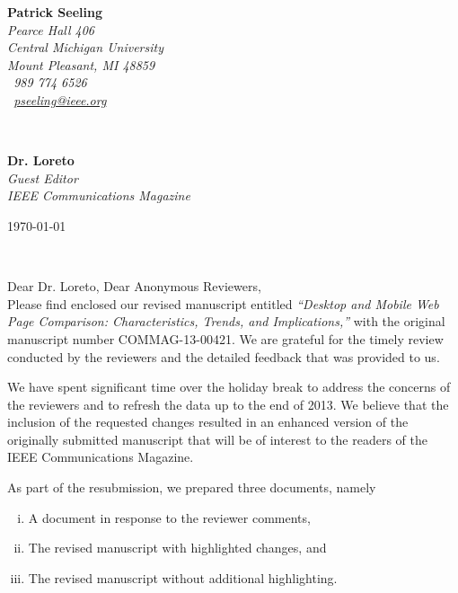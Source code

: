 \documentclass[11pt]{article}
\begin{document}
\hfill%
\begin{minipage}[t]{.6\textwidth}
\raggedleft%
{\bfseries Patrick Seeling}\\[.35ex]
\small\itshape%
Pearce Hall 406\\
Central Michigan University\\
Mount Pleasant, MI 48859\\[.35ex]
\Telefon~989 774 6526\\
\Letter~\href{mailto:pseeling@ieee.org}{pseeling@ieee.org}
\end{minipage}\\[1em]
%
\begin{minipage}[t]{.4\textwidth}
\raggedright%
{\bfseries Dr. Loreto}\\[.35ex]
\small\itshape%
Guest Editor \\
IEEE Communications Magazine
\end{minipage}
\hfill %
\begin{minipage}[t]{.4\textwidth}
\raggedleft %
\today
\end{minipage}\\[3em]
\raggedright
Dear Dr. Loreto, Dear Anonymous Reviewers,\\[2em]

Please find enclosed our revised manuscript entitled
\textit{``Desktop and Mobile Web Page Comparison: Characteristics, Trends, and Implications,''} with the original manuscript number COMMAG-13-00421.
We are grateful for the timely review conducted by the reviewers and the detailed feedback that was provided to us. 

We have spent significant time over the holiday break to address the concerns of the reviewers and to refresh the data up to the end of 2013.
We believe that the inclusion of the requested changes resulted in an enhanced version of the originally submitted manuscript that will be of interest to the readers of the IEEE Communications Magazine. 

As part of the resubmission, we prepared three documents, namely 
\begin{enumerate}[(i)]
	\item A document in response to the reviewer comments,
	\item The revised manuscript with highlighted changes, and
	\item The revised manuscript without additional highlighting.
\end{enumerate}
\end{document}
